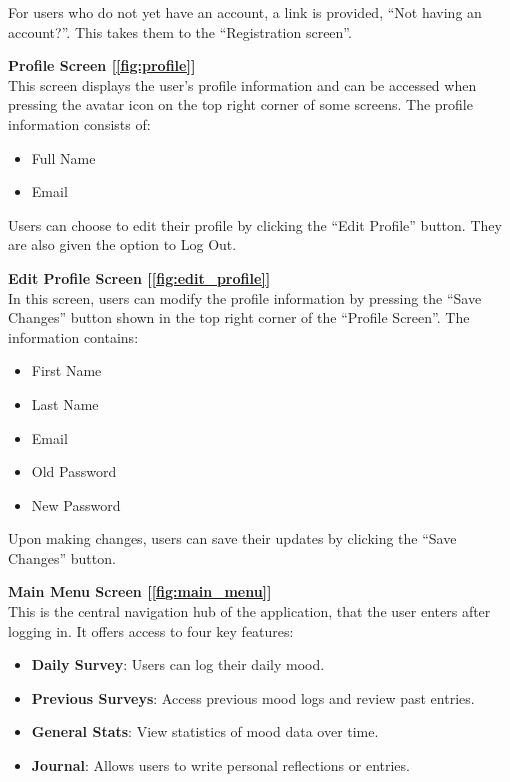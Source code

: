 \noindent For users who do not yet have an account, a link is provided, ``Not having an account?''. This takes them to the ``Registration screen''.

\vspace{5mm}

\noindent \textbf{Profile Screen [\ref{fig:profile}]} \\
This screen displays the user's profile information and can be accessed when pressing the avatar icon on the top right corner of some screens. The profile information consists of:

\begin{itemize}
    \item Full Name
    \item Email
\end{itemize}

\noindent Users can choose to edit their profile by clicking the ``Edit Profile'' button. They are also given the option to Log Out.

\vspace{5mm}

\noindent \textbf{Edit Profile Screen [\ref{fig:edit_profile}]} \\
In this screen, users can modify the profile information by pressing the ``Save Changes'' button shown in the top right corner of the ``Profile Screen''. The information contains:
\begin{itemize}
    \item First Name
    \item Last Name
    \item Email
    \item Old Password
    \item New Password
\end{itemize}

\noindent Upon making changes, users can save their updates by clicking the ``Save Changes'' button.

\vspace{5mm}

\noindent \textbf{Main Menu Screen [\ref{fig:main_menu}]} \\
This is the central navigation hub of the application, that the user enters after logging in. It offers access to four key features:
\begin{itemize}
    \item \textbf{Daily Survey}: Users can log their daily mood.
    \item \textbf{Previous Surveys}: Access previous mood logs and review past entries.
    \item \textbf{General Stats}: View statistics of mood data over time.
    \item \textbf{Journal}: Allows users to write personal reflections or entries.
\end{itemize}

